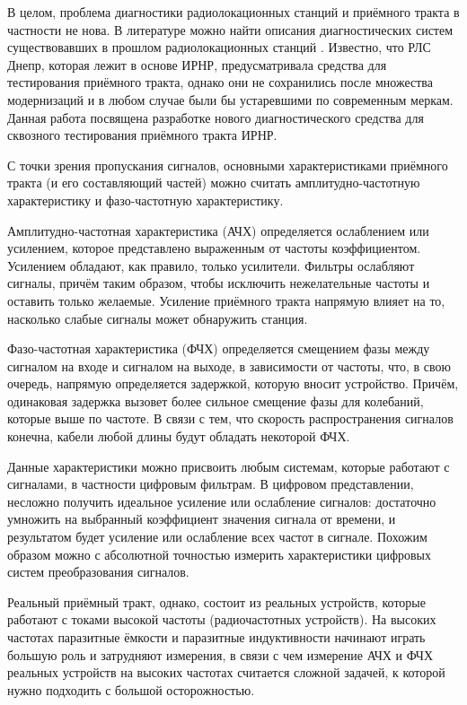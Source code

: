 \documentclass{report}
\begin{document}
В целом, проблема диагностики радиолокационных станций и приёмного тракта в частности не нова. В литературе можно найти описания диагностических систем существовавших в прошлом радиолокационных станций \cite{abm}. Известно, что РЛС Днепр, которая лежит в основе ИРНР, предусматривала средства для тестирования приёмного тракта, однако они не сохранились после множества модернизаций и в любом случае были бы устаревшими по современным меркам. Данная работа посвящена разработке нового диагностического средства для сквозного тестирования приёмного тракта ИРНР.

С точки зрения пропускания сигналов, основными характеристиками  приёмного тракта (и его составляющий частей) можно считать амплитудно-частотную характеристику и фазо-частотную характеристику.

Амплитудно-частотная характеристика (АЧХ) определяется ослаблением или усилением, которое представлено выраженным от частоты коэффициентом. Усилением обладают, как правило, только усилители. Фильтры ослабляют сигналы, причём таким образом, чтобы исключить нежелательные частоты и оставить только желаемые. Усиление приёмного тракта напрямую влияет на то, насколько слабые сигналы может обнаружить станция.

Фазо-частотная характеристика (ФЧХ) определяется смещением фазы между сигналом на входе и сигналом на выходе, в зависимости от частоты, что, в свою очередь, напрямую определяется задержкой, которую вносит устройство. Причём, одинаковая задержка вызовет более сильное смещение фазы для колебаний, которые выше по частоте. В связи с тем, что скорость распространения сигналов конечна, кабели любой длины будут обладать некоторой ФЧХ.


Данные характеристики можно присвоить любым системам, которые работают с сигналами, в частности цифровым фильтрам. В цифровом представлении, несложно получить идеальное усиление или ослабление сигналов: достаточно умножить на выбранный коэффициент значения сигнала от времени, и результатом будет усиление или ослабление всех частот в сигнале. Похожим образом можно с абсолютной точностью измерить характеристики цифровых систем преобразования сигналов.

Реальный приёмный тракт, однако, состоит из реальных устройств, которые работают с токами высокой частоты (радиочастотных устройств). На высоких частотах паразитные ёмкости и паразитные индуктивности начинают играть большую роль и затрудняют измерения, в связи с чем измерение АЧХ и ФЧХ реальных устройств на высоких частотах считается сложной задачей, к которой нужно подходить с большой осторожностью.
\end{document}
